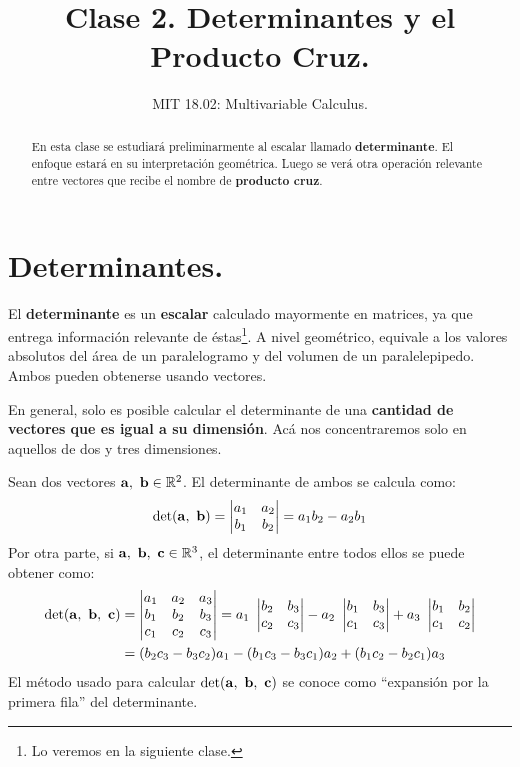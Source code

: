 \documentclass[12pt]{article}
\title{Clase 2. Determinantes y el Producto Cruz.}
\author{MIT 18.02: Multivariable Calculus.}
\date{}
\begin{document}


\maketitle

\begin{abstract}
\noindent En esta clase se estudiará preliminarmente al escalar llamado \textbf{determinante}. El enfoque estará en su interpretación geométrica. Luego se verá otra operación relevante entre vectores que recibe el nombre de \textbf{producto cruz}.
\end{abstract}


\section{Determinantes.}

El \textbf{determinante} es un \textbf{escalar} calculado mayormente en matrices, ya que entrega información relevante de éstas\footnote{Lo veremos en la siguiente clase.}. A nivel geométrico, equivale a los valores absolutos del área de un paralelogramo y del volumen de un paralelepipedo. Ambos pueden obtenerse usando vectores.

En general, solo es posible calcular el determinante de una \textbf{cantidad de vectores que es igual a su dimensión}. Acá nos concentraremos solo en aquellos de dos y tres dimensiones.

Sean dos vectores $\mathbf{a}, \ \mathbf{b} \in \mathbb{R}^{2}$. El determinante de ambos se calcula como:
\[
\det(\mathbf{a}, \ \mathbf{b}) =
\begin{vmatrix}
a_{1} & a_{2} \\
b_{1} & b_{2}
\end{vmatrix} =
a_{1}b_{2} - a_{2}b_{1}
\]
Por otra parte, si $\mathbf{a}, \ \mathbf{b}, \ \mathbf{c} \in \mathbb{R}^{3}$, el determinante entre todos ellos se puede obtener como:
\begin{align*}
\det(\vecmat{a}, \ \vecmat{b}, \ \vecmat{c}) &=
\begin{vmatrix}
a_{1} & a_{2} & a_{3} \\
b_{1} & b_{2} & b_{3} \\
c_{1} & c_{2} & c_{3}
\end{vmatrix}
= a_{1} \ 
\begin{vmatrix}
b_{2} & b_{3} \\
c_{2} & c_{3}
\end{vmatrix}
- a_{2} \ 
\begin{vmatrix}
b_{1} & b_{3} \\
c_{1} & c_{3}
\end{vmatrix}
+ a_{3} \ 
\begin{vmatrix}
b_{1} & b_{2} \\
c_{1} & c_{2}
\end{vmatrix} \\
&= (b_{2}c_{3} - b_{3}c_{2}) a_{1} - (b_{1}c_{3} - b_{3}c_{1}) a_{2} + (b_{1}c_{2} - b_{2}c_{1}) a_{3}
\end{align*}
El método usado para calcular $\det(\vecmat{a}, \ \vecmat{b}, \ \vecmat{c})$ se conoce como ``expansión por la primera fila'' del determinante.
\end{document}
